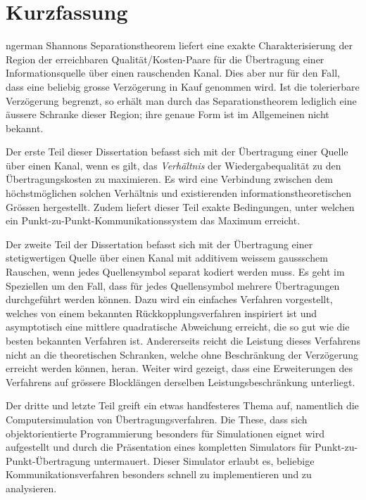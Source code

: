 \chapter*{Kurzfassung}

\begin{hyphenrules}{ngerman}
Shannons Separationstheorem liefert eine exakte Charakterisierung der Region
der erreichbaren Qualität/Kosten-Paare für die Übertragung einer
Informationsquelle über einen rauschenden Kanal. Dies aber nur für den Fall,
dass eine beliebig grosse Verzögerung in Kauf genommen wird. Ist die
tolerierbare Verzögerung begrenzt, so erhält man durch das Separationstheorem
lediglich eine äussere Schranke dieser Region; ihre genaue Form ist im
Allgemeinen nicht bekannt.  

Der erste Teil dieser Dissertation befasst sich mit der Übertragung einer Quelle
über einen Kanal, wenn es gilt, das \emph{Verhältnis} der Wiedergabequalität zu
den Übertragungskosten zu maximieren. Es wird eine Verbindung zwischen dem
höchstmöglichen solchen Verhältnis und existierenden informationstheoretischen
Grössen hergestellt. Zudem liefert dieser Teil exakte Bedingungen, unter welchen
ein Punkt-zu-Punkt-Kommunikationssystem das Maximum erreicht. 

Der zweite Teil der Dissertation befasst sich mit der Übertragung einer
stetigwertigen Quelle über einen Kanal mit additivem weissem gaussschem
Rauschen, wenn jedes Quellensymbol separat kodiert werden muss. Es geht im
Speziellen um den Fall, dass für jedes Quellensymbol mehrere Übertragungen
durchgeführt werden können. Dazu wird ein einfaches Verfahren vorgestellt,
welches von einem bekannten Rückkopplungsverfahren inspiriert ist und
asymptotisch eine mittlere quadratische Abweichung erreicht, die so gut wie die
besten bekannten Verfahren ist. Andererseits reicht die Leistung dieses
Verfahrens nicht an die theoretischen Schranken, welche ohne Beschränkung der
Verzögerung erreicht werden können, heran. Weiter wird gezeigt, dass eine
Erweiterungen des Verfahrens auf grössere Blocklängen derselben
Leistungsbeschränkung unterliegt.

Der dritte und letzte Teil greift ein etwas handfesteres Thema auf, namentlich
die Computersimulation von Übertragungsverfahren. Die These, dass sich
objektorientierte Programmierung besonders für Simulationen eignet wird
aufgestellt und durch die Präsentation eines kompletten Simulators für
Punkt-zu-Punkt-Übertragung untermauert. Dieser Simulator erlaubt es, beliebige
Kommunikationsverfahren besonders schnell zu implementieren und zu analysieren. 
\par
\end{hyphenrules}

